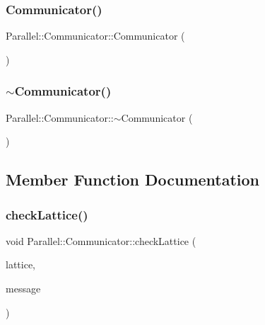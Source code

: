\subsubsection{\texorpdfstring{Communicator()}{Communicator()}}
{\footnotesize\ttfamily Parallel\+::\+Communicator\+::\+Communicator (\begin{DoxyParamCaption}{ }\end{DoxyParamCaption})}

\mbox{\label{class_parallel_1_1_communicator_ac1e7afc1984908e5a44a713e37131f0a}} 
\subsubsection{\texorpdfstring{$\sim$Communicator()}{~Communicator()}}
{\footnotesize\ttfamily Parallel\+::\+Communicator\+::$\sim$\+Communicator (\begin{DoxyParamCaption}{ }\end{DoxyParamCaption})}



\subsection{Member Function Documentation}
\mbox{\label{class_parallel_1_1_communicator_a0975f377dbde235d418ca7054001f3a3}} 
\subsubsection{\texorpdfstring{checkLattice()}{checkLattice()}}
{\footnotesize\ttfamily void Parallel\+::\+Communicator\+::check\+Lattice (\begin{DoxyParamCaption}\item[{\mbox{\hyperlink{class_lattice}{Lattice}}$<$ \mbox{\hyperlink{class_s_u3}{S\+U3}} $>$ $\ast$}]{lattice,  }\item[{std\+::string}]{message }\end{DoxyParamCaption})\hspace{0.3cm}{\ttfamily [static]}}

